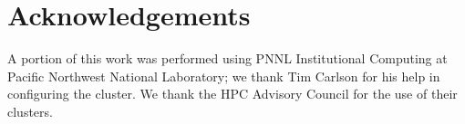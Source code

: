 
\section{Acknowledgements}

A portion of this work was performed using PNNL Institutional
Computing at Pacific Northwest National Laboratory; we thank Tim
Carlson for his help in configuring the cluster. We thank the HPC
Advisory Council for the use of their clusters.
